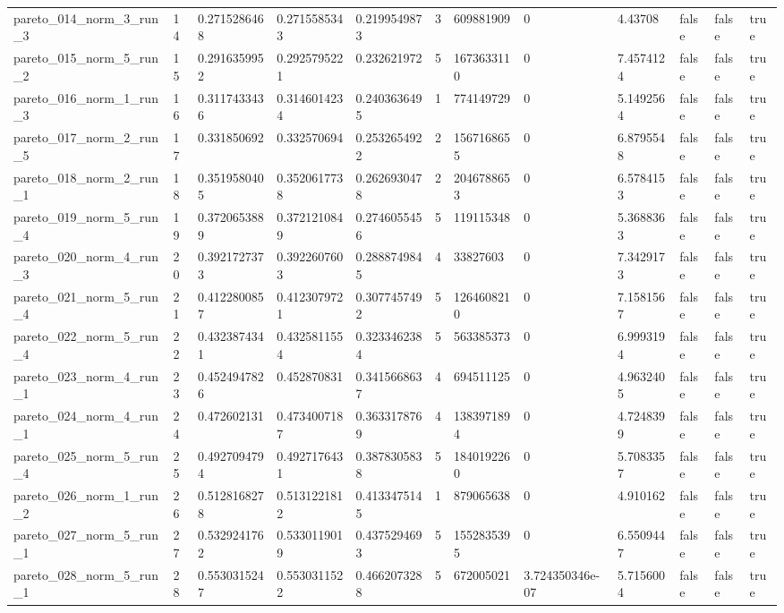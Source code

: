 \begin{tabular}{@{}llllllllllll@{}}
pareto\_014\_norm\_3\_run\_3 & 14 & 0.2715286468 & 0.2715585343 & 0.2199549873 & 3 & 609881909 & 0 & 4.43708 & false & false & true \\
pareto\_015\_norm\_5\_run\_2 & 15 & 0.2916359952 & 0.2925795221 & 0.232621972 & 5 & 1673633110 & 0 & 7.4574124 & false & false & true \\
pareto\_016\_norm\_1\_run\_3 & 16 & 0.3117433436 & 0.3146014234 & 0.2403636495 & 1 & 774149729 & 0 & 5.1492564 & false & false & true \\
pareto\_017\_norm\_2\_run\_5 & 17 & 0.331850692 & 0.332570694 & 0.2532654922 & 2 & 1567168655 & 0 & 6.8795548 & false & false & true \\
pareto\_018\_norm\_2\_run\_1 & 18 & 0.3519580405 & 0.3520617738 & 0.2626930478 & 2 & 2046788653 & 0 & 6.5784153 & false & false & true \\
pareto\_019\_norm\_5\_run\_4 & 19 & 0.3720653889 & 0.3721210849 & 0.2746055456 & 5 & 119115348 & 0 & 5.3688363 & false & false & true \\
pareto\_020\_norm\_4\_run\_3 & 20 & 0.3921727373 & 0.3922607603 & 0.2888749845 & 4 & 33827603 & 0 & 7.3429173 & false & false & true \\
pareto\_021\_norm\_5\_run\_4 & 21 & 0.4122800857 & 0.4123079721 & 0.3077457492 & 5 & 1264608210 & 0 & 7.1581567 & false & false & true \\
pareto\_022\_norm\_5\_run\_4 & 22 & 0.4323874341 & 0.4325811554 & 0.3233462384 & 5 & 563385373 & 0 & 6.9993194 & false & false & true \\
pareto\_023\_norm\_4\_run\_1 & 23 & 0.4524947826 & 0.452870831 & 0.3415668637 & 4 & 694511125 & 0 & 4.9632405 & false & false & true \\
pareto\_024\_norm\_4\_run\_1 & 24 & 0.472602131 & 0.4734007187 & 0.3633178769 & 4 & 1383971894 & 0 & 4.7248399 & false & false & true \\
pareto\_025\_norm\_5\_run\_4 & 25 & 0.4927094794 & 0.4927176431 & 0.3878305838 & 5 & 1840192260 & 0 & 5.7083357 & false & false & true \\
pareto\_026\_norm\_1\_run\_2 & 26 & 0.5128168278 & 0.5131221812 & 0.4133475145 & 1 & 879065638 & 0 & 4.910162 & false & false & true \\
pareto\_027\_norm\_5\_run\_1 & 27 & 0.5329241762 & 0.5330119019 & 0.4375294693 & 5 & 1552835395 & 0 & 6.5509447 & false & false & true \\
pareto\_028\_norm\_5\_run\_1 & 28 & 0.5530315247 & 0.5530311522 & 0.4662073288 & 5 & 672005021 & 3.724350346e-07 & 5.7156004 & false & false & true \\

\end{tabular}
